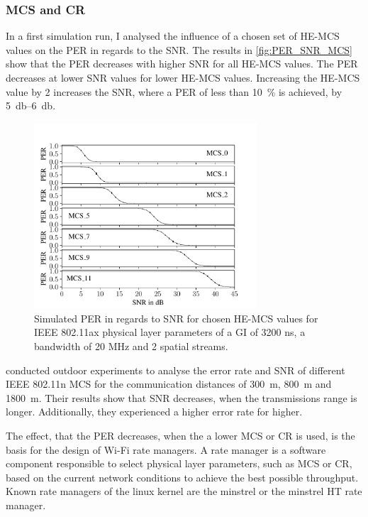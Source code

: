 \subsubsection*{\acf{MCS} and \acf{CR}}
In a first simulation run, I analysed the influence of a chosen set of HE-MCS values on the \ac{PER} in regards to the \ac{SNR}.
The results in \autoref{fig:PER_SNR_MCS} show that the \ac{PER} decreases with higher \ac{SNR} for all HE-MCS values. The
\ac{PER} decreases at lower \ac{SNR} values for lower HE-MCS values. Increasing the HE-MCS value by \num{2} increases the \ac{SNR}, where a \ac{PER} of less than
\SI{10}{\percent} is achieved, by \SIrange{5}{6}{\decibel}.
\begin{figure}[H]%
	\centering
	\includegraphics[width=0.74\textwidth]{figures/MCS_PER_to_SNR.pdf}
	\caption{Simulated PER in regards to SNR for chosen HE-MCS values for IEEE 802.11ax physical layer parameters
			of a GI of 3200 ns, a bandwidth of 20 MHz and 2 spatial streams.}
	\label{fig:PER_SNR_MCS}%
\end{figure}
\textcite{paul_characterizing_2011} conducted outdoor experiments to analyse the error rate and \ac{SNR} of different IEEE 802.11n \ac{MCS} for the
communication distances of \SI{300}{\meter}, \SI{800}{\meter} and \SI{1800}{\meter}. Their results show that \ac{SNR} decreases, when the transmissions range is longer.
Additionally, they experienced a higher error rate for higher.

The effect, that the \ac{PER} decreases, when the a lower \ac{MCS} or \ac{CR} is used, is the basis for the design of Wi-Fi rate managers.
A rate manager is a software component responsible to select physical layer parameters, such as \ac{MCS} or \ac{CR}, based on the current network conditions to
achieve the best possible throughput. Known rate managers of the linux kernel are the minstrel or the minstrel HT rate manager.

